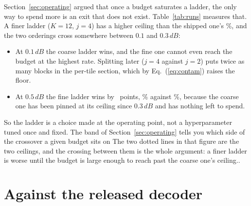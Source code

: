 \documentclass[10pt,twocolumn,letterpaper]{article}
\newcommand{\dB}{\,dB}
\begin{document}
\label{sec:ladder}

\begin{table}[t]
\centering
\resizebox{\columnwidth}{!}{}
\caption{\textbf{Ladder settings}, mean saving (\%) over the five rates, on
each run's own latest checkpoint. Ceilings are $100(1-c_j)$ for that ladder,
corrected by the offset the hook count shows. $^{\ast}$ some rate did not reach
the budget. $^{\dagger}$ the saving is from the arithmetic model rather than
counted off the decode, and is therefore $0.4$--$0.8$ points optimistic; only
RECIPE512 has been re-measured with hooks at every budget.}
\label{tab:runs}
\end{table}

Section~\ref{sec:operating} argued that once a budget saturates a ladder, the
only way to spend more is an exit that does not exist. Table~\ref{tab:runs}
measures that. A finer ladder ($K{=}12$, $j{=}4$) has a higher ceiling than the
shipped one's \Ceiling\%, and the two orderings cross somewhere between $0.1$
and $0.3\dB$:

\begin{itemize}\itemsep1pt
\item At $0.1\dB$ the coarse ladder wins, and the fine one cannot even reach the
      budget at the highest rate. Splitting later ($j{=}4$ against $j{=}2$) puts
      twice as many blocks in the per-tile section, which by
      Eq.~(\ref{eq:contam}) raises the floor.
\item At $0.5\dB$ the fine ladder wins by \FineHalfGain\ points, \FineHalfDb\% against
      \CoarseHalfDb\%, because the coarse one has been pinned at its ceiling
      since $0.3\dB$ and has nothing left to spend.
\end{itemize}

So the ladder is a choice made at the operating point, not a hyperparameter
tuned once and fixed. The band of Section~\ref{sec:operating} tells you which
side of the crossover a given budget sits on The two dotted lines in that figure are the two ceilings, and the crossing
between them is the whole argument: a finer ladder is worse until the budget is
large enough to reach past the coarse one's ceiling..

\section{Against the released decoder}
\label{sec:released}
\end{document}
